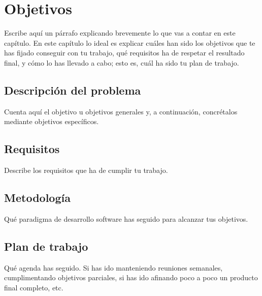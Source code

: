 \chapter{Objetivos}
\label{cap:capitulo2}


Escribe aquí un párrafo explicando brevemente lo que vas a contar en este capítulo. En este capítulo lo ideal es explicar cuáles han sido los objetivos que te has fijado conseguir con tu trabajo, qué requisitos ha de respetar el resultado final, y cómo lo has llevado a cabo; esto es, cuál ha sido tu plan de trabajo.\\

\section{Descripción del problema}
\label{sec:descripcion}

Cuenta aquí el objetivo u objetivos generales y, a continuación, concrétalos mediante objetivos específicos.

\section{Requisitos}
\label{sec:requisitos}

Describe los requisitos que ha de cumplir tu trabajo.

\section{Metodología}
\label{sec:metodologia}

Qué paradigma de desarrollo software has seguido para alcanzar tus objetivos.

\section{Plan de trabajo}
\label{sec:plantrabajo}

Qué agenda has seguido. Si has ido manteniendo reuniones semanales, cumplimentando objetivos parciales, si has ido afinando poco a poco un producto final completo, etc.
